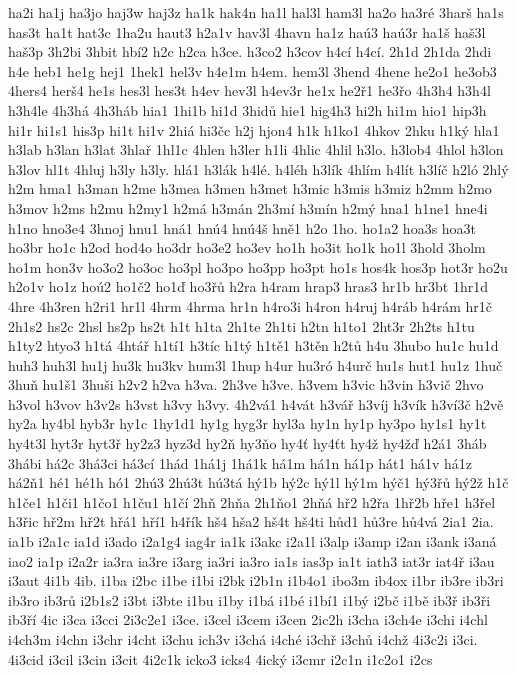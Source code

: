{ha2i
ha1j
ha3jo
haj3w
haj3z
ha1k
hak4n
ha1l
hal3l
ham3l
ha2o
ha3ré
3harš
ha1s
has3t
ha1t
hat3c
1ha2u
haut3
h2a1v
hav3l
4havn
ha1z
haú3
haú3r
ha1š
haš3l
haš3p
3h2bi
3hbit
hbí2
h2c
h2ca
h3ce.
h3co2
h3cov
h4cí
h4cí.
2h1d
2h1da
2hdi
h4e
heb1
he1g
hej1
1hek1
hel3v
h4e1m
h4em.
hem3l
3hend
4hene
he2o1
he3ob3
4hers4
herš4
he1s
hes3l
hes3t
h4ev
hev3l
h4ev3r
he1x
he2ř1
he3řo
4h3h4
h3h4l
h3h4le
4h3há
4h3háb
hia1
1hi1b
hi1d
3hidů
hie1
hig4h3
hi2h
hi1m
hio1
hip3h
hi1r
hi1s1
his3p
hi1t
hi1v
2hiá
hi3čc
h2j
hjon4
h1k
h1ko1
4hkov
2hku
h1ký
hla1
h3lab
h3lan
h3lat
3hlař
1hl1c
4hlen
h3ler
h1li
4hlic
4hlil
h3lo.
h3lob4
4hlol
h3lon
h3lov
hl1t
4hluj
h3ly
h3ly.
hlá1
h3lák
h4lé.
h4léh
h3lík
4hlím
h4lít
h3líč
h2ló
2hlý
h2m
hma1
h3man
h2me
h3mea
h3men
h3met
h3mic
h3mis
h3miz
h2mm
h2mo
h3mov
h2ms
h2mu
h2my1
h2má
h3mán
2h3mí
h3mín
h2mý
hna1
h1ne1
hne4i
h1no
hno3e4
3hnoj
hnu1
hná1
hnú4
hnú4š
hně1
h2o
1ho.
ho1a2
hoa3s
hoa3t
ho3br
ho1c
h2od
hod4o
ho3dr
ho3e2
ho3ev
ho1h
ho3it
ho1k
ho1l
3hold
3holm
ho1m
hon3v
ho3o2
ho3oc
ho3pl
ho3po
ho3pp
ho3pt
ho1s
hos4k
hos3p
hot3r
ho2u
h2o1v
ho1z
hoú2
ho1č2
ho1ď
ho3řů
h2ra
h4ram
hrap3
hras3
hr1b
hr3bt
1hr1d
4hre
4h3ren
h2ri1
hr1l
4hrm
4hrma
hr1n
h4ro3i
h4ron
h4ruj
h4ráb
h4rám
hr1č
2h1s2
hs2c
2hsl
hs2p
hs2t
h1t
h1ta
2h1te
2h1ti
h2tn
h1to1
2ht3r
2h2ts
h1tu
h1ty2
htyo3
h1tá
4htář
h1tí1
h3tíc
h1tý
h1tě1
h3těn
h2tů
h4u
3hubo
hu1c
hu1d
huh3
huh3l
hu1j
hu3k
hu3kv
hum3l
1hup
h4ur
hu3ró
h4urč
hu1s
hut1
hu1z
1huč
3huň
hu1š1
3huši
h2v2
h2va
h3va.
2h3ve
h3ve.
h3vem
h3vic
h3vin
h3vič
2hvo
h3vol
h3vov
h3v2s
h3vst
h3vy
h3vy.
4h2vá1
h4vát
h3vář
h3víj
h3vík
h3ví3č
h2vě
hy2a
hy4bl
hyb3r
hy1c
1hy1d1
hy1g
hyg3r
hyl3a
hy1n
hy1p
hy3po
hy1s1
hy1t
hy4t3l
hyt3r
hyt3ř
hy2z3
hyz3d
hy2ň
hy3ňo
hy4ť
hy4ťt
hy4ž
hy4žď
h2á1
3háb
3hábi
há2c
3há3ci
há3cí
1hád
1há1j
1há1k
há1m
há1n
há1p
hát1
há1v
há1z
há2ň1
hé1
hé1h
hó1
2hú3
2hú3t
hú3tá
hý1b
hý2c
hý1l
hý1m
hýč1
hý3řů
hý2ž
h1č
h1če1
h1či1
h1čo1
h1ču1
h1čí
2hň
2hňa
2h1ňo1
2hňá
hř2
h2řa
1hř2b
hře1
h3řel
h3řic
hř2m
hř2t
hřá1
hří1
h4řík
hš4
hša2
hš4t
hš4ti
hůd1
hů3re
hů4vá
2ia1
2ia.
ia1b
i2a1c
ia1d
i3ado
i2a1g4
iag4r
ia1k
i3akc
i2a1l
i3alp
i3amp
i2an
i3ank
i3aná
iao2
ia1p
i2a2r
ia3ra
ia3re
i3arg
ia3ri
ia3ro
ia1s
ias3p
ia1t
iath3
iat3r
iat4ř
i3au
i3aut
4i1b
4ib.
i1ba
i2bc
i1be
i1bi
i2bk
i2b1n
i1b4o1
ibo3m
ib4ox
i1br
ib3re
ib3ri
ib3ro
ib3rů
i2b1s2
i3bt
i3bte
i1bu
i1by
i1bá
i1bé
i1bí1
i1bý
i2bč
i1bě
ib3ř
ib3ři
ib3ří
4ic
i3ca
i3cci
2i3c2e1
i3ce.
i3cel
i3cem
i3cen
2ic2h
i3cha
i3ch4e
i3chi
i4chl
i4ch3m
i4chn
i3chr
i4cht
i3chu
ich3v
i3chá
i4ché
i3chř
i3chů
i4chž
4i3c2i
i3ci.
4i3cid
i3cil
i3cin
i3cit
4i2c1k
icko3
icks4
4ický
i3cmr
i2c1n
i1c2o1
i2cs
}
